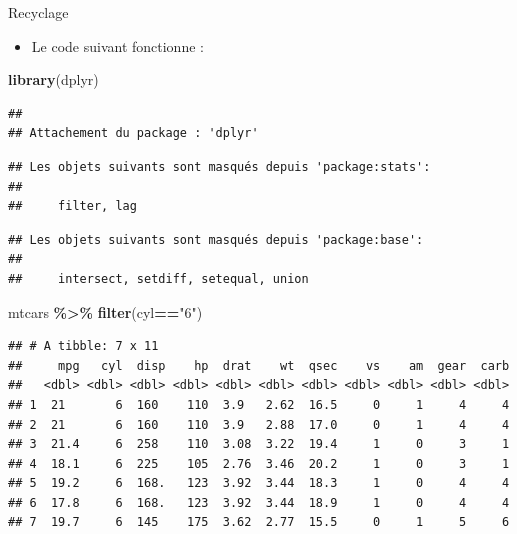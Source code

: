 \documentclass[
  ignorenonframetext,
]{beamer}
\newenvironment{Shaded}{\begin{snugshade}}{\end{snugshade}}
\newcommand{\FunctionTok}[1]{\textcolor[rgb]{0.13,0.29,0.53}{\textbf{#1}}}
\newcommand{\NormalTok}[1]{#1}
\newcommand{\SpecialCharTok}[1]{\textcolor[rgb]{0.81,0.36,0.00}{\textbf{#1}}}
\newcommand{\StringTok}[1]{\textcolor[rgb]{0.31,0.60,0.02}{#1}}
\providecommand{\tightlist}{%
  \setlength{\itemsep}{0pt}\setlength{\parskip}{0pt}}
\begin{document}
\begin{frame}[fragile]{Recyclage}
\protect\hypertarget{recyclage}{}
\begin{itemize}
\tightlist
\item
  Le code suivant fonctionne :
\end{itemize}

\tiny

\begin{Shaded}
\begin{Highlighting}[]
\FunctionTok{library}\NormalTok{(dplyr)}
\end{Highlighting}
\end{Shaded}

\begin{verbatim}
## 
## Attachement du package : 'dplyr'
\end{verbatim}

\begin{verbatim}
## Les objets suivants sont masqués depuis 'package:stats':
## 
##     filter, lag
\end{verbatim}

\begin{verbatim}
## Les objets suivants sont masqués depuis 'package:base':
## 
##     intersect, setdiff, setequal, union
\end{verbatim}

\begin{Shaded}
\begin{Highlighting}[]
\NormalTok{mtcars }\SpecialCharTok{\%\textgreater{}\%} \FunctionTok{filter}\NormalTok{(cyl}\SpecialCharTok{==}\StringTok{"6"}\NormalTok{)}
\end{Highlighting}
\end{Shaded}

\begin{verbatim}
## # A tibble: 7 x 11
##     mpg   cyl  disp    hp  drat    wt  qsec    vs    am  gear  carb
##   <dbl> <dbl> <dbl> <dbl> <dbl> <dbl> <dbl> <dbl> <dbl> <dbl> <dbl>
## 1  21       6  160    110  3.9   2.62  16.5     0     1     4     4
## 2  21       6  160    110  3.9   2.88  17.0     0     1     4     4
## 3  21.4     6  258    110  3.08  3.22  19.4     1     0     3     1
## 4  18.1     6  225    105  2.76  3.46  20.2     1     0     3     1
## 5  19.2     6  168.   123  3.92  3.44  18.3     1     0     4     4
## 6  17.8     6  168.   123  3.92  3.44  18.9     1     0     4     4
## 7  19.7     6  145    175  3.62  2.77  15.5     0     1     5     6
\end{verbatim}


\end{frame}
\end{document}
